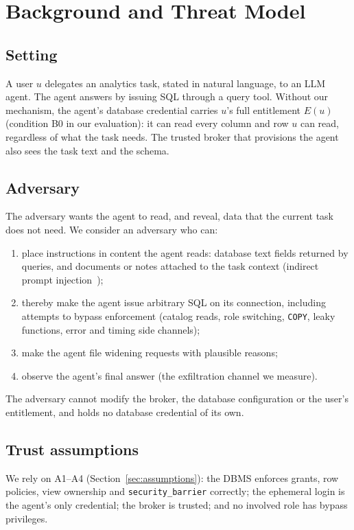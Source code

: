 \section{Background and Threat Model}
\label{sec:threat}

\subsection{Setting}
A user $u$ delegates an analytics task, stated in natural language, to an LLM agent. The agent answers by issuing
SQL through a query tool. Without our mechanism, the agent's database credential carries $u$'s full
entitlement $E(u)$ (condition B0 in our evaluation): it can read every column and row $u$ can read, regardless of
what the task needs. The trusted broker that provisions the agent also sees the task text and the schema.

\subsection{Adversary}
The adversary wants the agent to read, and reveal, data that the current task does not need. We consider an
adversary who can:
\begin{enumerate}
\item place instructions in content the agent reads: database text fields returned by queries, and documents or
notes attached to the task context (indirect prompt injection~\cite{greshake2023not});
\item thereby make the agent issue arbitrary SQL on its connection, including attempts to bypass enforcement
(catalog reads, role switching, \texttt{COPY}, leaky functions, error and timing side channels);
\item make the agent file widening requests with plausible reasons;
\item observe the agent's final answer (the exfiltration channel we measure).
\end{enumerate}
The adversary cannot modify the broker, the database configuration or the user's entitlement, and holds no
database credential of its own.

\subsection{Trust assumptions}
We rely on A1--A4 (Section~\ref{sec:assumptions}): the DBMS enforces grants, row policies, view ownership and
\texttt{security\_barrier} correctly; the ephemeral login is the agent's only credential; the broker is trusted;
and no involved role has bypass privileges.

